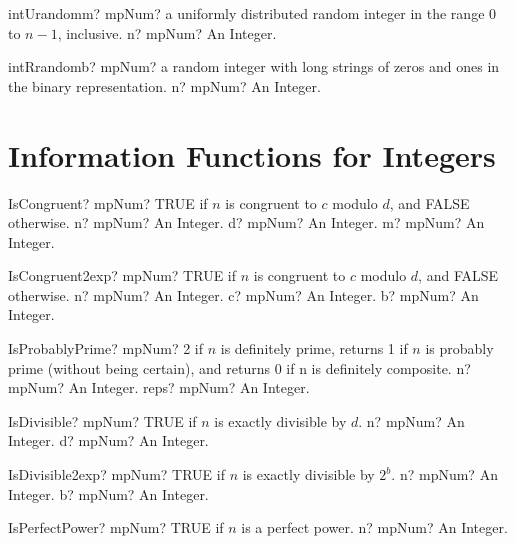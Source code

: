 \documentclass[12pt,a4paper,openany]{book}
\begin{document}
\begin{mpFunctionsExtract}
\mpFunctionOne
{intUrandomm? mpNum? a uniformly distributed random integer in the range 0 to $n - 1$, inclusive.}
{n? mpNum? An Integer.}
\end{mpFunctionsExtract}

\begin{mpFunctionsExtract}
\mpFunctionOne
{intRrandomb? mpNum? a random integer with long strings of zeros and ones in the binary representation.}
{n? mpNum? An Integer.}
\end{mpFunctionsExtract}

\section{Information Functions for Integers}

\begin{mpFunctionsExtract}
\mpFunctionThree
{IsCongruent? mpNum? TRUE if $n$ is congruent to $c$ modulo $d$, and FALSE otherwise.}
{n? mpNum? An Integer.}
{d? mpNum? An Integer.}
{m? mpNum? An Integer.}
\end{mpFunctionsExtract}

\begin{mpFunctionsExtract}
\mpFunctionThree
{IsCongruent2exp? mpNum? TRUE if $n$ is congruent to $c$ modulo $d$, and FALSE otherwise.}
{n? mpNum? An Integer.}
{c? mpNum? An Integer.}
{b? mpNum? An Integer.}
\end{mpFunctionsExtract}

\begin{mpFunctionsExtract}
\mpFunctionTwo
{IsProbablyPrime? mpNum? 2 if $n$ is definitely prime, returns 1 if $n$ is probably prime (without being certain), and returns 0 if n is definitely composite.}
{n? mpNum? An Integer.}
{reps? mpNum? An Integer.}
\end{mpFunctionsExtract}

\begin{mpFunctionsExtract}
\mpFunctionTwo
{IsDivisible? mpNum? TRUE if $n$ is exactly divisible by $d$.}
{n? mpNum? An Integer.}
{d? mpNum? An Integer.}
\end{mpFunctionsExtract}

\begin{mpFunctionsExtract}
\mpFunctionTwo
{IsDivisible2exp? mpNum? TRUE if $n$ is exactly divisible by $2^b$.}
{n? mpNum? An Integer.}
{b? mpNum? An Integer.}
\end{mpFunctionsExtract}

\begin{mpFunctionsExtract}
\mpFunctionOne
{IsPerfectPower? mpNum? TRUE if $n$ is a perfect power.}
{n? mpNum? An Integer.}
\end{mpFunctionsExtract}
\end{document}
